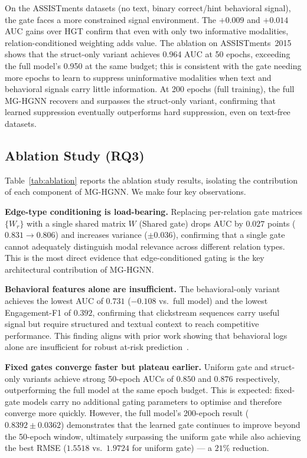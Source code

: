 \documentclass[sigconf]{acmart}
\begin{document}
On the ASSISTments datasets (no text, binary correct/hint
behavioral signal), the gate faces a more constrained
signal environment. The $+0.009$ and $+0.014$ AUC gains
over HGT confirm that even with only two informative
modalities, relation-conditioned weighting adds value.
The ablation on ASSISTments~2015 shows that the
struct-only variant achieves 0.964 AUC at 50 epochs,
exceeding the full model's 0.950 at the same budget;
this is consistent with the gate needing more epochs
to learn to suppress uninformative modalities when text
and behavioral signals carry little information.
At 200 epochs (full training), the full MG-HGNN
recovers and surpasses the struct-only variant,
confirming that learned suppression eventually outperforms
hard suppression, even on text-free datasets.

\subsection{Ablation Study (RQ3)}
\label{sec:ablation}

Table~\ref{tab:ablation} reports the ablation study
results, isolating the contribution of each component
of MG-HGNN. We make four key observations.

\textbf{Edge-type conditioning is load-bearing.}
Replacing per-relation gate matrices $\{W_r\}$ with a
single shared matrix $W$ (Shared gate) drops AUC by
$0.027$ points ($0.831 \to 0.806$) and increases
variance ($\pm 0.036$), confirming that a single gate
cannot adequately distinguish modal relevance across
different relation types. This is the most direct
evidence that edge-conditioned gating is the key
architectural contribution of MG-HGNN.

\textbf{Behavioral features alone are insufficient.}
The behavioral-only variant achieves the lowest AUC of
$0.731$ ($-0.108$ vs.\ full model) and the lowest
Engagement-F1 of $0.392$, confirming that clickstream
sequences carry useful signal but require structured
and textual context to reach competitive performance.
This finding aligns with prior work showing that
behavioral logs alone are insufficient for robust
at-risk prediction~\citep{huang2024temporal}.

\textbf{Fixed gates converge faster but plateau earlier.}
Uniform gate and struct-only variants achieve strong
50-epoch AUCs of $0.850$ and $0.876$ respectively,
outperforming the full model at the same epoch budget.
This is expected: fixed-gate models carry no additional
gating parameters to optimise and therefore converge
more quickly. However, the full model's 200-epoch result
($0.8392 \pm 0.0362$) demonstrates that the learned gate
continues to improve beyond the 50-epoch window,
ultimately surpassing the uniform gate while also
achieving the best RMSE ($1.5518$ vs.\ $1.9724$ for
uniform gate) --- a $21\%$ reduction.
\end{document}
